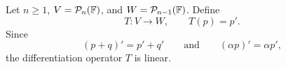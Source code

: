 \begin{example}
  Let $n\geq1$, $V=\mathcal P_n(\mathbb{F})$, and
  $W=\mathcal P_{n-1}(\mathbb{F})$.
  Define
  \[
    T\colon V\longrightarrow W,
    \qquad
    T(p)=p'.
  \]
  Since
  \[
    (p+q)'=p'+q'
    \qquad\text{and}\qquad
    (\alpha p)'=\alpha p',
  \]
  the differentiation operator $T$ is linear.
\end{example}
